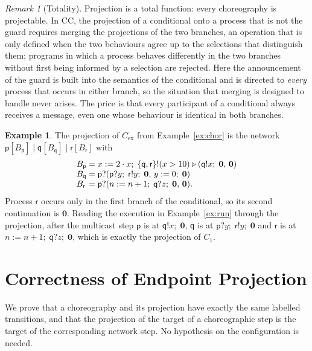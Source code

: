 \documentclass[11pt]{article}
\theoremstyle{plain}
\theoremstyle{definition}
\newtheorem{example}[theorem]{Example}
\theoremstyle{remark}
\newtheorem{remark}[theorem]{Remark}
\newcommand{\nil}{\mathbf{0}}
\newcommand{\seq}{;\;}
\newcommand{\pp}{\mathsf{p}}
\newcommand{\qq}{\mathsf{q}}
\newcommand{\rr}{\mathsf{r}}
\newcommand{\sendbr}[4]{#1!#2 \mathbin{\triangleright} (#3,\, #4)}
\newcommand{\recvbr}[3]{#1?(#2,\, #3)}
\begin{document}
\begin{remark}[Totality]\label{rem:total}
  Projection is a total function: every choreography is projectable.  In CC,
  the projection of a conditional onto a process that is not the guard
  requires merging the projections of the two branches, an operation that is
  only defined when the two behaviours agree up to the selections that
  distinguish them; programs in which a process behaves differently in the two
  branches without first being informed by a selection are rejected.  Here the
  announcement of the guard is built into the semantics of the conditional and
  is directed to \emph{every} process that occurs in either branch, so the
  situation that merging is designed to handle never arises.  The price is that
  every participant of a conditional always receives a message, even one whose
  behaviour is identical in both branches.
\end{remark}

\begin{example}\label{ex:epp}
  The projection of $C_{\mathrm{ex}}$ from Example~\ref{ex:chor} is the network
  $\pp[B_\pp] \mid \qq[B_\qq] \mid \rr[B_\rr]$ with
  \[
  \begin{array}{l@{\;=\;}l}
    B_\pp & x := 2\cdot x \seq \sendbr{\{\qq,\rr\}}{(x > 10)}{\qq!x \seq \nil}{\nil}\\
    B_\qq & \recvbr{\pp}{\pp?y \seq \rr!y \seq \nil}{y := 0 \seq \nil}\\
    B_\rr & \recvbr{\pp}{n := n+1 \seq \qq?z \seq \nil}{\nil}.
  \end{array}
  \]
  Process $\rr$ occurs only in the first branch of the conditional, so its
  second continuation is $\nil$.  Reading the execution in
  Example~\ref{ex:run} through the projection, after the multicast step $\pp$
  is at $\qq!x\seq\nil$, $\qq$ is at $\pp?y\seq\rr!y\seq\nil$ and $\rr$ is at
  $n := n+1\seq\qq?z\seq\nil$, which is exactly the projection of $C_1$.
\end{example}

\section{Correctness of Endpoint Projection}
\label{sec:correct}

We prove that a choreography and its projection have exactly the same
labelled transitions, and that the projection of the target of a
choreographic step is the target of the corresponding network step.  No
hypothesis on the configuration is needed.
\end{document}
